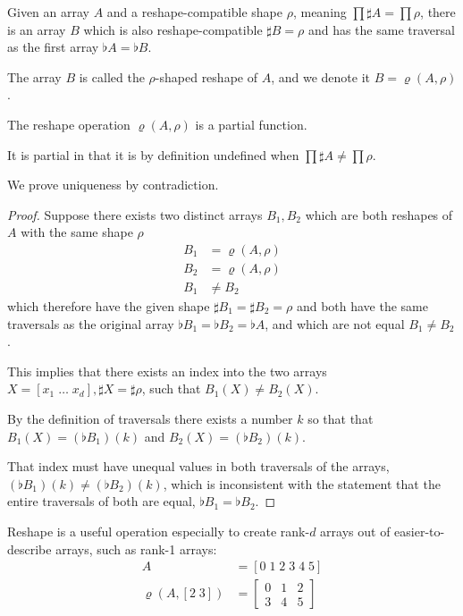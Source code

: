 \documentclass{DIKU-report-variant}
\begin{document}
\begin{definition}
  \label{def:reshape}
  Given an array \(A\) and a reshape-compatible shape \(\rho\), meaning \(\prod \sharp A = \prod\rho\),
  there is an array \(B\) which is also reshape-compatible \(\sharp B = \rho\) and
  has the same traversal as the first array \(\flat A = \flat B\).
  
  The array \(B\) is called the \(\rho\)-shaped reshape of \(A\), and we denote
  it \(B = \varrho(A, \rho)\).
\end{definition}

\begin{theorem}
  \label{the:unique-reshape}
  The reshape operation \(\varrho(A, \rho)\) is a partial function.

  It is partial in that it is by definition undefined when \(\prod \sharp A \ne \prod \rho\).

  We prove uniqueness by contradiction.
\end{theorem}
\begin{proof}
  Suppose there exists two distinct arrays \(B_1, B_2\) which are both reshapes of \(A\) with
  the same shape \(\rho\)
  \begin{align*}
    B_1 &= \varrho(A, \rho) \\
    B_2 &= \varrho(A, \rho) \\
    B_1 &\ne B_2
  \end{align*}
  which therefore  have the given shape \(\sharp B_1 = \sharp B_2 = \rho\)
  and both have the same traversals as the original array \(\flat B_1 = \flat B_2 = \flat A\),
  and which are not equal \(B_1 \neq B_2\).
  
  This implies that there exists an index into the two arrays \(X = [x_1\; \dots\; x_d], \sharp X = \sharp \rho\),
  such that \(B_1(X) \neq B_2(X)\).

  By the definition of traversals there exists a number \(k\)
  so that that \(B_1(X) = (\flat B_1)(k)\) and \(B_2(X) = (\flat B_2)(k)\).
  
  That index must have unequal values in both traversals of the arrays, \((\flat B_1)(k) \neq (\flat B_2)(k)\),
  which is inconsistent with the statement that the entire traversals of both are equal, \(\flat B_1 = \flat B_2\). \contradict
\end{proof}

\begin{example}
  \label{ex:reshape}
  Reshape is a useful operation especially to create rank-\(d\) arrays
  out of easier-to-describe arrays, such as rank-1 arrays:
  \begin{align*}
    A &= [0\; 1\; 2\; 3\; 4\; 5] \\
    \varrho(A, [2\;3]) &= \begin{bmatrix}
      0 & 1 & 2 \\
      3 & 4 & 5 
    \end{bmatrix}
  \end{align*}
\end{example}
\end{document}
